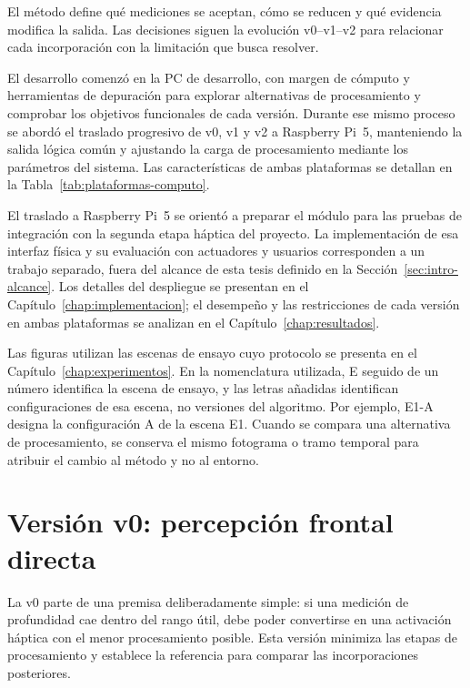 El método define qué mediciones se aceptan, cómo se reducen y qué evidencia modifica la salida.
Las decisiones siguen la evolución v0--v1--v2 para relacionar cada incorporación con la
limitación que busca resolver.

El desarrollo comenzó en la PC de desarrollo, con margen de cómputo y herramientas de depuración
para explorar alternativas de procesamiento y comprobar los objetivos funcionales de cada versión.
Durante ese mismo proceso se abordó el traslado progresivo de v0, v1 y v2 a Raspberry Pi~5,
manteniendo la salida lógica común y ajustando la carga de procesamiento mediante los parámetros
del sistema. Las características de ambas plataformas se detallan en la
Tabla~\ref{tab:plataformas-computo}.

El traslado a Raspberry Pi~5 se orientó a preparar el módulo para las pruebas de integración con
la segunda etapa háptica del proyecto. La implementación de esa interfaz física y su evaluación
con actuadores y usuarios corresponden a un trabajo separado, fuera del alcance de esta tesis
definido en la Sección~\ref{sec:intro-alcance}. Los detalles del despliegue se presentan en el
Capítulo~\ref{chap:implementacion}; el desempeño y las restricciones de cada versión en ambas
plataformas se analizan en el Capítulo~\ref{chap:resultados}.

Las figuras utilizan las escenas de ensayo cuyo protocolo se presenta en el
Capítulo~\ref{chap:experimentos}. En la nomenclatura utilizada, E seguido de un número identifica
la escena de ensayo, y las letras añadidas identifican configuraciones de esa escena, no versiones
del algoritmo. Por ejemplo, E1-A designa la configuración A de la escena E1. Cuando se compara una
alternativa de procesamiento, se conserva el mismo fotograma o tramo temporal para atribuir el
cambio al método y no al entorno.

\section{Versión v0: percepción frontal directa}
\label{sec:metodo-v0}

La v0 parte de una premisa deliberadamente simple: si una medición de profundidad cae dentro del
rango útil, debe poder convertirse en una activación háptica con el menor procesamiento posible.
Esta versión minimiza las etapas de procesamiento y establece la referencia para comparar las
incorporaciones posteriores.

